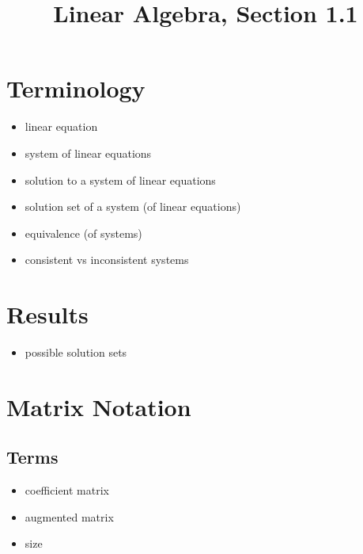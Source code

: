 \documentclass[14pt]{article}
\date{}
\begin{document}
\title{Linear Algebra, Section 1.1}
\maketitle




\section*{Terminology}
\begin{itemize}
    \item linear equation
    \vspace{3cm}
    \item system of linear equations
    \vspace{3cm}
    \item solution to a system of linear equations
    \item solution set of a system (of linear equations)
    \item equivalence (of systems)
    \item consistent vs inconsistent systems
\end{itemize}

\pagebreak

\section*{Results}
\begin{itemize}
    \item possible solution sets
\end{itemize}

\section*{Matrix Notation} 

\bigskip
\subsection*{Terms}
\begin{itemize}
    \item coefficient matrix
    \item augmented matrix
    \item size
\end{itemize}



\vspace{.2cm}
\end{document}
